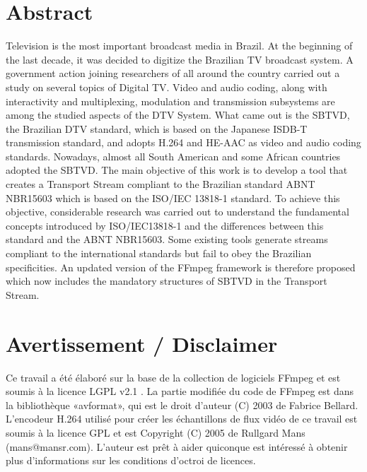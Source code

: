 \documentclass[12pt,a4paper]{article}
\begin{document}
\section*{Abstract}
Television is the most important broadcast media in Brazil. At the beginning of the last decade, it was decided to digitize the Brazilian TV broadcast system. A government action joining researchers of all around the country carried out a study on several topics of Digital TV. Video and audio coding, along with interactivity and multiplexing, modulation and transmission subsystems are among the studied aspects of the DTV System. What came out is the SBTVD, the Brazilian DTV standard, which is based on the Japanese ISDB-T transmission standard, and adopts H.264 and HE-AAC as video and audio coding standards. Nowadays, almost all South American and some African countries adopted the SBTVD. The main objective of this work is to develop a tool that creates a Transport Stream compliant to the Brazilian standard ABNT NBR15603 which is based on the ISO/IEC 13818-1 standard. To achieve this objective, considerable research was carried out to understand the fundamental concepts introduced by ISO/IEC13818-1 and the differences between this standard and the ABNT NBR15603. Some existing tools generate streams compliant to the international standards but fail to obey the Brazilian specificities. An updated version of the FFmpeg framework is therefore proposed which now includes the mandatory structures of SBTVD in the Transport Stream.


\newpage
\listoffigures  %
\listoftables   %
\newpage
\TBsommaire

\section*{Avertissement / Disclaimer}

\-\newline
Ce travail a été élaboré sur la base de la collection de logiciels FFmpeg \cite{ffmpeg} et est soumis à la licence LGPL v2.1 \cite{gplv2}. La partie modifiée du code de FFmpeg est dans la bibliothèque «avformat», qui est le droit d'auteur (C) 2003 de Fabrice Bellard. L'encodeur H.264 utilisé pour créer les échantillons de flux vidéo de ce travail est soumis à la licence GPL et est Copyright (C) 2005 de Rullgard Mans (mans@mansr.com). L'auteur est prêt à aider quiconque est intéressé à obtenir plus d'informations sur les conditions d'octroi de licences.
\end{document}
